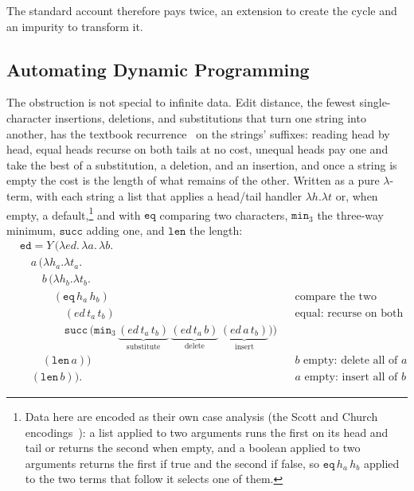 The standard account therefore pays twice, an extension to create the cycle and an impurity to transform it.

\subsection{Automating Dynamic Programming}

The obstruction is not special to infinite data. Edit distance, the fewest single-character insertions, deletions, and substitutions that turn one string into another, has the textbook recurrence~\cite{wagner1974-string-correction} on the strings' suffixes: reading head by head, equal heads recurse on both tails at no cost, unequal heads pay one and take the best of a substitution, a deletion, and an insertion, and once a string is empty the cost is the length of what remains of the other. Written as a pure $\lambda$-term, with each string a list that applies a head/tail handler $\lambda h.\lambda t$ or, when empty, a default,\footnote{Data here are encoded as their own case analysis (the Scott and Church encodings~\cite{mogensen1992-self-interpretation}): a list applied to two arguments runs the first on its head and tail or returns the second when empty, and a boolean applied to two arguments returns the first if true and the second if false, so $\mathtt{eq}\,h_a\,h_b$ applied to the two terms that follow it selects one of them.} and with $\mathtt{eq}$ comparing two characters, $\mathtt{min}_3$ the three-way minimum, $\mathtt{succ}$ adding one, and $\mathtt{len}$ the length:
\[
  \begin{aligned}
    &\mathtt{ed} = Y\,\big(\lambda\mathit{ed}.\,\lambda a.\,\lambda b.\\
      &\quad a\,\big(\lambda h_a.\lambda t_a.\\
        &\qquad b\,\big(\lambda h_b.\lambda t_b.\\
          &\qquad\quad (\mathtt{eq}\,h_a\,h_b)
          &&\text{compare the two heads}\\
          &\qquad\qquad (\mathit{ed}\,t_a\,t_b)
          &&\text{equal: recurse on both tails, no cost}\\
          &\qquad\qquad \mathtt{succ}\,\big(\mathtt{min}_3\,
            \underbrace{(\mathit{ed}\,t_a\,t_b)}_{\text{substitute}}\,
            \underbrace{(\mathit{ed}\,t_a\,b)}_{\text{delete}}\,
        \underbrace{(\mathit{ed}\,a\,t_b)}_{\text{insert}}\big)\big)\\
      &\qquad (\mathtt{len}\,a)\big)
      &&\text{$b$ empty: delete all of $a$}\\
    &\quad (\mathtt{len}\,b)\big).
    &&\text{$a$ empty: insert all of $b$}
  \end{aligned}
\]
